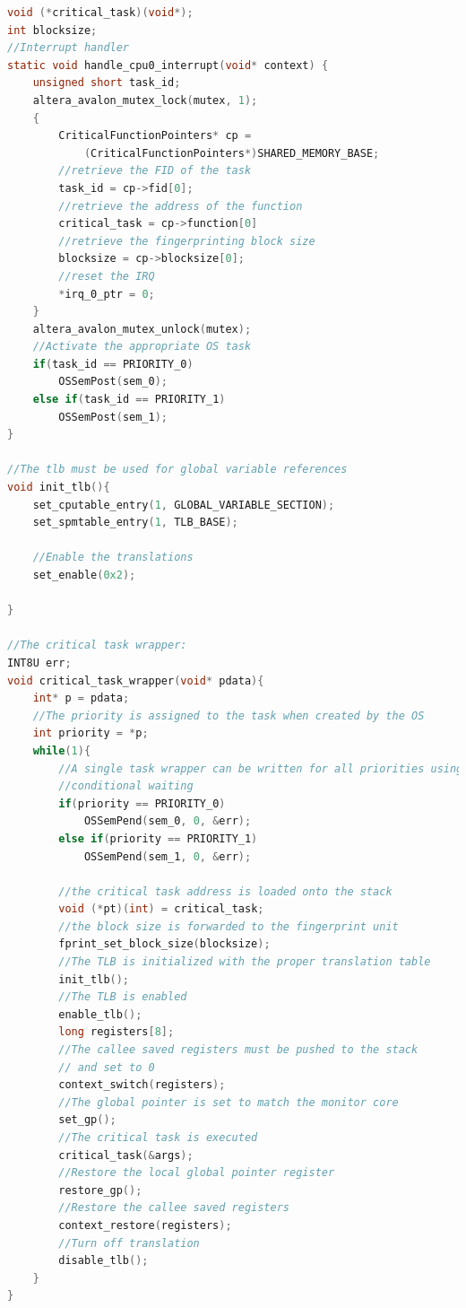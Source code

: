 \begin{lstlisting}[frame=single,language=C,label=l:cpu_response,caption=Plain core 0 responds to the request from the monitor.]
void (*critical_task)(void*);
int blocksize;
//Interrupt handler
static void handle_cpu0_interrupt(void* context) {
	unsigned short task_id;
	altera_avalon_mutex_lock(mutex, 1);
	{
        CriticalFunctionPointers* cp = 
            (CriticalFunctionPointers*)SHARED_MEMORY_BASE;
        //retrieve the FID of the task
		task_id = cp->fid[0];
		//retrieve the address of the function
		critical_task = cp->function[0]
		//retrieve the fingerprinting block size
		blocksize = cp->blocksize[0];
		//reset the IRQ
		*irq_0_ptr = 0;
	}
	altera_avalon_mutex_unlock(mutex);
	//Activate the appropriate OS task
	if(task_id == PRIORITY_0)
		OSSemPost(sem_0);
	else if(task_id == PRIORITY_1)
		OSSemPost(sem_1);
}

//The tlb must be used for global variable references
void init_tlb(){
	set_cputable_entry(1, GLOBAL_VARIABLE_SECTION);
	set_spmtable_entry(1, TLB_BASE);

	//Enable the translations
	set_enable(0x2);

}

//The critical task wrapper:
INT8U err;
void critical_task_wrapper(void* pdata){
	int* p = pdata;
    //The priority is assigned to the task when created by the OS
	int priority = *p;
	while(1){
		//A single task wrapper can be written for all priorities using
		//conditional waiting
		if(priority == PRIORITY_0)
			OSSemPend(sem_0, 0, &err);
		else if(priority == PRIORITY_1)
			OSSemPend(sem_1, 0, &err);
	    
	    //the critical task address is loaded onto the stack
	    void (*pt)(int) = critical_task;
		//the block size is forwarded to the fingerprint unit	    
	    fprint_set_block_size(blocksize);
	    //The TLB is initialized with the proper translation table
		init_tlb();
		//The TLB is enabled
	    enable_tlb();
		long registers[8];
		//The callee saved registers must be pushed to the stack
		// and set to 0
		context_switch(registers);
		//The global pointer is set to match the monitor core
		set_gp();
		//The critical task is executed
		critical_task(&args);
		//Restore the local global pointer register
		restore_gp();
		//Restore the callee saved registers
		context_restore(registers);
		//Turn off translation
		disable_tlb();
	}
}
\end{lstlisting}


